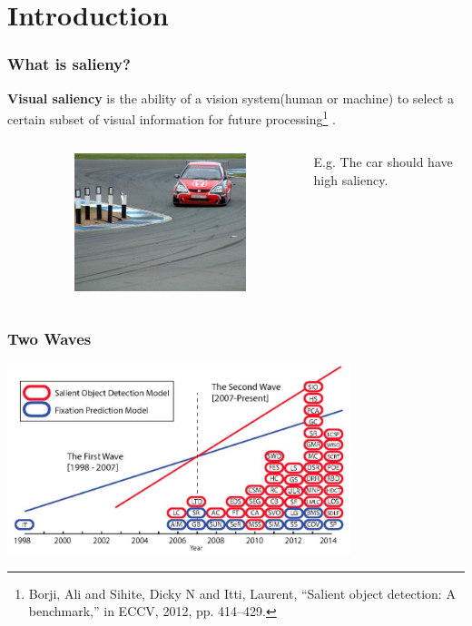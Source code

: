 \documentclass[notheorems,serif,table,compress]{beamer}  %
\begin{document}
\section{Introduction}



\begin{frame}
\frametitle{What is salieny?}
{\color{blue}\textbf{Visual saliency}} is the ability of a vision system(human or machine) to select a certain subset of visual information for future processing\footnote{Borji, Ali and Sihite, Dicky N and Itti, Laurent, “Salient object detection: A benchmark,” in ECCV, 2012, pp. 414–429.} .

\begin{columns}
\begin{column}{\leftmargini}
\end{column}
\begin{column}{.55\linewidth}
\begin{figure}
 \includegraphics[width=5cm]{car}
\end{figure}
\end{column}

\begin{column}{0.7\linewidth}
E.g. The car should have \\
high saliency.
\end{column}
\end{columns}\vspace{1ex}
\end{frame}

\begin{frame}
\frametitle{Two Waves}
\centering\includegraphics[width=10cm]{wave}
\end{frame}
\end{document}
